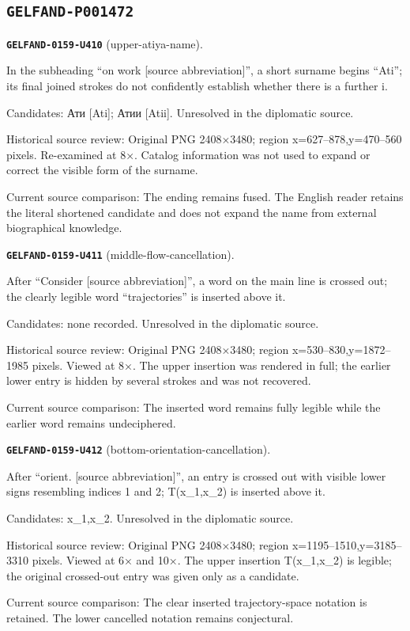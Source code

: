 \subsection*{\texttt{GELFAND-P001472}}
\par\noindent\leavevmode{}\label{GELFAND-0159-U410}\label{GELFAND-P001472:upper-atiya-name}\textbf{\texttt{GELFAND-0159-U410}} (upper-atiya-name).\nopagebreak[4]\par
In the subheading “on work [source abbreviation]”, a short surname begins “Ati”; its final joined strokes do not confidently establish whether there is a further i.\par
Candidates: Ати [Ati]; Атии [Atii]. Unresolved in the diplomatic source.\par
Historical source review: Original PNG 2408×3480; region x=627–878,y=470–560 pixels. Re-examined at 8×. Catalog information was not used to expand or correct the visible form of the surname.\par
Current source comparison: The ending remains fused. The English reader retains the literal shortened candidate and does not expand the name from external biographical knowledge.\par\medskip
\par\noindent\leavevmode{}\label{GELFAND-0159-U411}\label{GELFAND-P001472:middle-flow-cancellation}\textbf{\texttt{GELFAND-0159-U411}} (middle-flow-cancellation).\nopagebreak[4]\par
After “Consider [source abbreviation]”, a word on the main line is crossed out; the clearly legible word “trajectories” is inserted above it.\par
Candidates: none recorded. Unresolved in the diplomatic source.\par
Historical source review: Original PNG 2408×3480; region x=530–830,y=1872–1985 pixels. Viewed at 8×. The upper insertion was rendered in full; the earlier lower entry is hidden by several strokes and was not recovered.\par
Current source comparison: The inserted word remains fully legible while the earlier word remains undeciphered.\par\medskip
\par\noindent\leavevmode{}\label{GELFAND-0159-U412}\label{GELFAND-P001472:bottom-orientation-cancellation}\textbf{\texttt{GELFAND-0159-U412}} (bottom-orientation-cancellation).\nopagebreak[4]\par
After “orient. [source abbreviation]”, an entry is crossed out with visible lower signs resembling indices 1 and 2; T(x\_1,x\_2) is inserted above it.\par
Candidates: x\_1,x\_2. Unresolved in the diplomatic source.\par
Historical source review: Original PNG 2408×3480; region x=1195–1510,y=3185–3310 pixels. Viewed at 6× and 10×. The upper insertion T(x\_1,x\_2) is legible; the original crossed-out entry was given only as a candidate.\par
Current source comparison: The clear inserted trajectory-space notation is retained. The lower cancelled notation remains conjectural.\par\medskip
